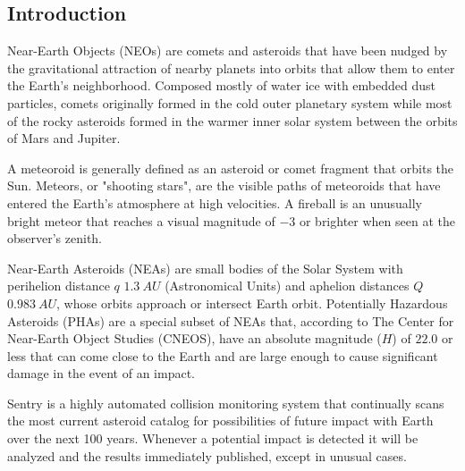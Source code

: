 \documentclass[a1,portrait]{a1poster}
\begin{document}
\begin{multicols}{2}


\color{Black} %

\section*{Introduction}

Near-Earth Objects (NEOs) are comets and asteroids that have been nudged by the gravitational
attraction of nearby planets into orbits that allow them to enter the Earth’s neighborhood. Composed
mostly of water ice with embedded dust particles, comets originally formed in the cold outer planetary
system while most of the rocky asteroids formed in the warmer inner solar system between the orbits of
Mars and Jupiter.  \cite{nasaBasics}

A meteoroid is generally defined as an asteroid or comet fragment that orbits the Sun. Meteors, or
"shooting stars", are the visible paths of meteoroids that have entered the Earth’s atmosphere at high
velocities. A fireball is an unusually bright meteor that reaches a visual magnitude of $-3$ or
brighter when seen at the observer’s zenith. \cite{nasaFireballs}

Near-Earth Asteroids (NEAs) are small bodies of the Solar System with perihelion distance $q$
$1.3\:AU$ (Astronomical Units) and aphelion distances $Q$ $0.983\:AU$, whose orbits approach or
intersect Earth orbit. \cite{rukmini2016statistical} Potentially Hazardous Asteroids (PHAs) are a
special subset of NEAs that, according to The Center for Near-Earth Object Studies (CNEOS), have an
absolute magnitude ($H$) of $22.0$ or less that can come close to the Earth and are large enough to
cause significant damage in the event of an impact. \cite{zhou2024martians}

Sentry is a highly automated collision monitoring system that continually scans the most current
asteroid catalog for possibilities of future impact with Earth over the next 100 years. Whenever a
potential impact is detected it will be analyzed and the results immediately published, except in
unusual cases. \cite{nasaSentryEarth}


\end{multicols}
\end{document}
